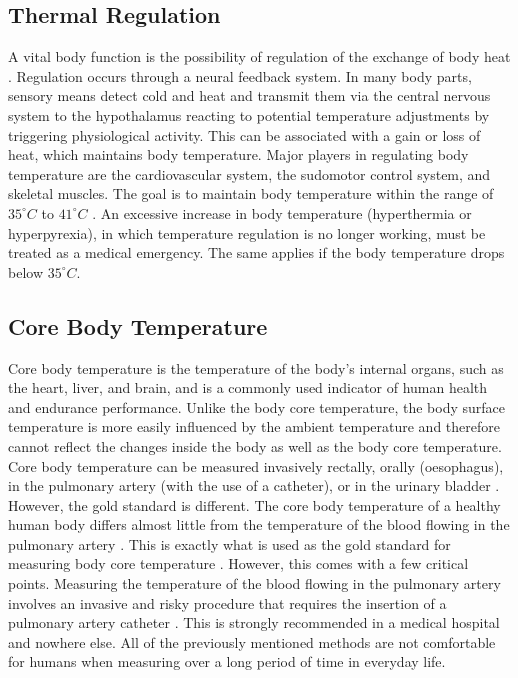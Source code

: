 \subsection{Thermal Regulation}
\label{Background:BodyTemperature:ThermalRegulation}
A vital body function is the possibility of regulation of the exchange of body heat \cite{grodzinskyUnderstandingFeverBody2020}.
Regulation occurs through a neural feedback system. 
In many body parts, sensory means detect cold and heat and transmit them via the central nervous system to the hypothalamus reacting to potential temperature adjustments by triggering physiological activity. 
This can be associated with a gain or loss of heat, which maintains body temperature.
Major players in regulating body temperature are the cardiovascular system, the sudomotor control system, and skeletal muscles. 
The goal is to maintain body temperature within the range of $35^\circ C$ to $41^\circ C$ \cite{pierauTemperatursensibilitaet2001}. 
An excessive increase in body temperature (hyperthermia or hyperpyrexia), in which temperature regulation is no longer working, must be treated as a medical emergency.
The same applies if the body temperature drops below $35^\circ C$.

\subsection{Core Body Temperature}
\label{Background:BodyTemperature:CBT}
Core body temperature is the temperature of the body's internal organs, such as the heart, liver, and brain, and is a commonly used indicator of human health and endurance performance.
Unlike the body core temperature, the body surface temperature is more easily influenced by the ambient temperature and therefore cannot reflect the changes inside the body as well as the body core temperature.
Core body temperature can be measured invasively rectally, orally (oesophagus), in the pulmonary artery (with the use of a catheter), or in the urinary bladder \cite{moranCoreTemperatureMeasurement2002a}.
However, the gold standard is different.
The core body temperature of a healthy human body differs almost little from the temperature of the blood flowing in the pulmonary artery \cite{krizanacFemoroiliacalArteryPulmonary2013, holtzclawMonitoringBodyTemperature1993}.
This is exactly what is used as the gold standard for measuring body core temperature \cite{krizanacFemoroiliacalArteryPulmonary2013, holtzclawMonitoringBodyTemperature1993, fulbrookCoreBodyTemperature1997, maxtonEstimatingCoreTemperature2004}.
However, this comes with a few critical points.
Measuring the temperature of the blood flowing in the pulmonary artery involves an invasive and risky procedure that requires the insertion of a pulmonary artery catheter \cite{yeohRevisitingTympanicMembrane2017}.
This is strongly recommended in a medical hospital and nowhere else.
All of the previously mentioned methods are not comfortable for humans when measuring over a long period of time in everyday life.

